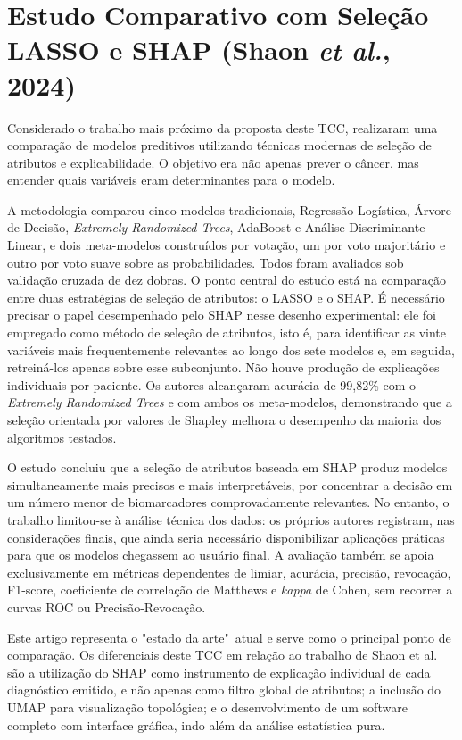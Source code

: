 \documentclass[
    12pt
    ,oneside
    ,a4paper
    ,chapter=TITLE
    ,section=TITLE
    ,sumario=abnt-6027-2012
    ,english,brazil]{abntex2} %
\begin{document}
\section{Estudo Comparativo com Seleção LASSO e SHAP (Shaon \textit{et al.}, 2024)}

Considerado o trabalho mais próximo da proposta deste TCC,  realizaram uma comparação de modelos preditivos utilizando técnicas modernas de seleção de atributos e explicabilidade. O objetivo era não apenas prever o câncer, mas entender quais variáveis eram determinantes para o modelo.

A metodologia comparou cinco modelos tradicionais, Regressão Logística, Árvore de Decisão, \textit{Extremely Randomized Trees}, AdaBoost e Análise Discriminante Linear, e dois meta-modelos construídos por votação, um por voto majoritário e outro por voto suave sobre as probabilidades. Todos foram avaliados sob validação cruzada de dez dobras. O ponto central do estudo está na comparação entre duas estratégias de seleção de atributos: o LASSO e o SHAP. É necessário precisar o papel desempenhado pelo SHAP nesse desenho experimental: ele foi empregado como método de seleção de atributos, isto é, para identificar as vinte variáveis mais frequentemente relevantes ao longo dos sete modelos e, em seguida, retreiná-los apenas sobre esse subconjunto. Não houve produção de explicações individuais por paciente. Os autores alcançaram acurácia de 99,82\% com o \textit{Extremely Randomized Trees} e com ambos os meta-modelos, demonstrando que a seleção orientada por valores de Shapley melhora o desempenho da maioria dos algoritmos testados.

O estudo concluiu que a seleção de atributos baseada em SHAP produz modelos simultaneamente mais precisos e mais interpretáveis, por concentrar a decisão em um número menor de biomarcadores comprovadamente relevantes. No entanto, o trabalho limitou-se à análise técnica dos dados: os próprios autores registram, nas considerações finais, que ainda seria necessário disponibilizar aplicações práticas para que os modelos chegassem ao usuário final. A avaliação também se apoia exclusivamente em métricas dependentes de limiar, acurácia, precisão, revocação, F1-score, coeficiente de correlação de Matthews e \textit{kappa} de Cohen, sem recorrer a curvas ROC ou Precisão-Revocação.

Este artigo representa o "estado da arte"\ atual e serve como o principal ponto de comparação. Os diferenciais deste TCC em relação ao trabalho de Shaon et al. são a utilização do SHAP como instrumento de explicação individual de cada diagnóstico emitido, e não apenas como filtro global de atributos; a inclusão do UMAP para visualização topológica; e o desenvolvimento de um software completo com interface gráfica, indo além da análise estatística pura.
\end{document}

